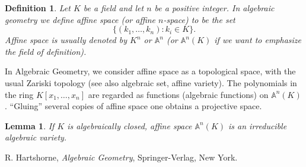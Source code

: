 \documentclass[12pt]{article}
\newtheorem*{defn}{Definition}
\newtheorem*{lemma}{Lemma}
\theoremstyle{definition}
\begin{document}
\begin{defn}
Let $K$ be a field and let $n$ be  a positive integer. In algebraic geometry we define affine space (or affine $n$-space) to be the set
$$\{ (k_1,\ldots,k_n): k_i \in K\}.$$
Affine space is usually denoted by $K^n$ or $\mathbb{A}^n$ (or $\mathbb{A}^n(K)$ if we want to emphasize the field of definition).
\end{defn}

In Algebraic Geometry, we consider affine space as a topological space, with the usual Zariski topology (see also algebraic set, affine variety). The polynomials in the ring $K[x_1,\ldots,x_n]$ are regarded as functions (algebraic functions) on $\mathbb{A}^n(K)$. ``Gluing'' several copies of affine space one obtains a projective space.

\begin{lemma}  
If $K$ is algebraically closed, affine space $\mathbb{A}^n(K)$ is an irreducible algebraic variety.
\end{lemma} 

\begin{thebibliography}{9}
 R. Hartshorne, {\em Algebraic Geometry},
Springer-Verlag, New York.
\end{thebibliography}
\end{document}
